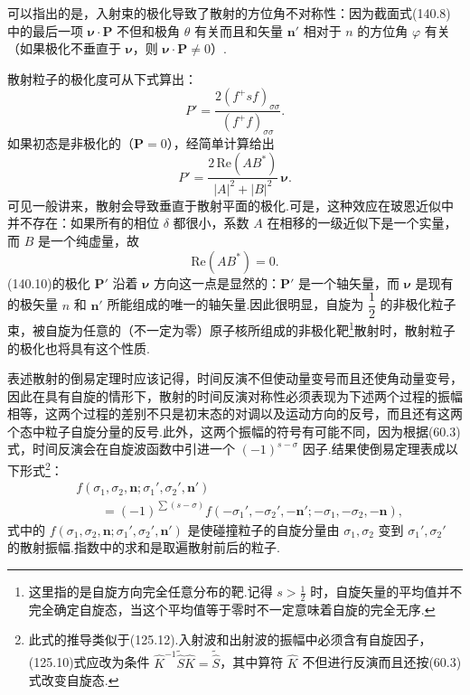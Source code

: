 可以指出的是，入射束的极化导致了散射的方位角不对称性：因为截面式(140.8)中的最后一项 $\boldsymbol{\nu}\cdot\boldsymbol{P}$ 不但和极角 $\theta$ 有关而且和矢量 $\boldsymbol{n}'$ 相对于 $n$ 的方位角 $\varphi$ 有关（如果极化不垂直于 $\boldsymbol{\nu}$，则
$\boldsymbol{\nu}\cdot\boldsymbol{P}\neq0$）.

散射粒子的极化度可从下式算出：
\begin{equation}
  P'=\frac{2\left(f^{+}sf\right)_{\sigma\sigma}}
  {\left(f^{+}f\right)_{\sigma\sigma}}.
\end{equation}
如果初态是非极化的（$\boldsymbol{P}=0$），经简单计算给出
\begin{equation}
  P'=\frac{2\,\mathrm{Re}(AB^{*})}{|A|^2+|B|^2}\,\boldsymbol{\nu}.
\end{equation}
可见一般讲来，散射会导致垂直于散射平面的极化.可是，这种效应在玻恩近似中并不存在：如果所有的相位 $\delta$ 都很小，系数 $A$ 在相移的一级近似下是一个实量，而 $B$ 是一个纯虚量，故
\begin{equation*}
  \mathrm{Re}\left(AB^{*}\right)=0.
\end{equation*}
(140.10)的极化 $\boldsymbol{P}'$ 沿着 $\boldsymbol{\nu}$ 方向这一点是显然的：$\boldsymbol{P}'$ 是一个轴矢量，而 $\boldsymbol{\nu}$ 是现有的极矢量 $n$ 和 $\boldsymbol{n}'$ 所能组成的唯一的轴矢量.因此很明显，自旋为 $\dfrac{1}{2}$ 的非极化粒子束，被自旋为任意的（不一定为零）原子核所组成的非极化靶\footnote{这里指的是自旋方向完全任意分布的靶.记得 $s>\frac{1}{2}$ 时，自旋矢量的平均值并不完全确定自旋态，当这个平均值等于零时不一定意味着自旋的完全无序.}散射时，散射粒子的极化也将具有这个性质.

表述散射的倒易定理时应该记得，时间反演不但使动量变号而且还使角动量变号，因此在具有自旋的情形下，散射的时间反演对称性必须表现为下述两个过程的振幅相等，这两个过程的差别不只是初末态的对调以及运动方向的反号，而且还有这两个态中粒子自旋分量的反号.此外，这两个振幅的符号有可能不同，因为根据(60.3)式，时间反演会在自旋波函数中引进一个
$(-1)^{s-\sigma}$ 因子.结果使倒易定理表成以下形式\footnote{此式的推导类似于(125.12).入射波和出射波的振幅中必须含有自旋因子，(125.10)式应改为条件 $\hat{K}^{-1}\tilde{\hat{S}}\hat{K}=\tilde{\hat{S}}$，其中算符 $\hat{K}$ 不但进行反演而且还按(60.3)式改变自旋态.}：
\begin{equation}
\begin{aligned}
  &f(\sigma_1,\sigma_2,\boldsymbol{n};
  \sigma_1',\sigma_2',\boldsymbol{n}')\\
  &\qquad=(-1)^{\sum(s-\sigma)}
  f(-\sigma_1',-\sigma_2',-\boldsymbol{n}';
  -\sigma_1,-\sigma_2,-\boldsymbol{n}),
\end{aligned}
\end{equation}
式中的
$f(\sigma_1,\sigma_2,\boldsymbol{n};\sigma_1',\sigma_2',\boldsymbol{n}')$
是使碰撞粒子的自旋分量由 $\sigma_1,\sigma_2$ 变到 $\sigma_1',\sigma_2'$ 的散射振幅.指数中的求和是取遍散射前后的粒子.

